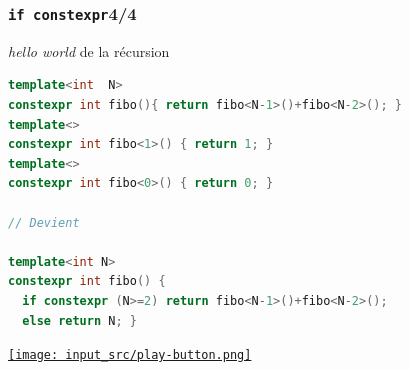 \documentclass[C++.tex]{subfiles}
\begin{document}
\begin{frame}[fragile]
	\frametitle{\lstinline|if constexpr|\titlehfill{}4/4}
	\begin{block}{\textit{hello world} de la récursion}
		\begin{lstlisting}[language=C++]
template<int  N>
constexpr int fibo(){ return fibo<N-1>()+fibo<N-2>(); }
template<>
constexpr int fibo<1>() { return 1; }
template<>
constexpr int fibo<0>() { return 0; }

// Devient

template<int N>
constexpr int fibo() {
  if constexpr (N>=2) return fibo<N-1>()+fibo<N-2>();
  else return N; }\end{lstlisting}
	\end{block}

	\hfill
	\href{https://godbolt.org/#g:!((g:!((g:!((h:codeEditor,i:(filename:'1',fontScale:14,fontUsePx:'0',j:1,lang:c%2B%2B,selection:(endColumn:1,endLineNumber:31,positionColumn:1,positionLineNumber:31,selectionStartColumn:1,selectionStartLineNumber:31,startColumn:1,startLineNumber:31),source:'%23include+%3Ciostream%3E%0A%0Atemplate+%3Ctypename+T%3E+auto+foo(T+t)%0A%7B%0A++if+constexpr+(std::is_pointer_v%3CT%3E)%0A++++return+*t%3B%0A++else%0A++++return+t%3B%0A%7D%0A%0Atemplate%3Cint+N%3E%0Aconstexpr+int+fibo()%0A%7B%0A++if+constexpr+(N%3E%3D2)%0A++++return+fibo%3CN-1%3E()%2Bfibo%3CN-2%3E()%3B%0A++else+return+N%3B%0A%7D%0A%0Aint+main()%0A%7B%0A++%7B%0A++++int+a+%3D+10,+b+%3D+5%3B%0A++++int*+ptr+%3D+%26b%3B%0A++++std::cout+%3C%3C+foo(a)+%3C%3C+!'+!'+%3C%3C+foo(ptr)+%3C%3C+!'%5Cn!'%3B%0A++%7D%0A%0A++%7B%0A++++std::cout+%3C%3C+fibo%3C8%3E()+%3C%3C+!'%5Cn!'%3B%0A++%7D%0A%7D%0A'),l:'5',n:'0',o:'C%2B%2B+source+%231',t:'0')),k:50,l:'4',n:'0',o:'',s:0,t:'0'),(g:!((h:executor,i:(argsPanelShown:'1',compilationPanelShown:'0',compiler:g112,compilerOutShown:'0',execArgs:'',execStdin:'',fontScale:14,fontUsePx:'0',j:1,lang:c%2B%2B,libs:!((name:boost,ver:'175')),options:'-std%3Dc%2B%2B17',source:1,stdinPanelShown:'1',tree:'1',wrap:'0'),l:'5',n:'0',o:'Executor+x86-64+gcc+11.2+(C%2B%2B,+Editor+%231)',t:'0')),header:(),k:50,l:'4',n:'0',o:'',s:0,t:'0')),l:'2',n:'0',o:'',t:'0')),version:4}{\texttt{[image: input\_src/play-button.png]}}
\end{frame}
\end{document}
